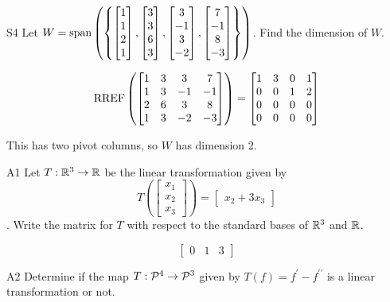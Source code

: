 \documentclass{sbgLAquiz}
\begin{document}
\begin{extract}\newpage\end{extract}
\begin{problem}{S4}
Let $W = {\rm span} \left( \left\{ \begin{bmatrix} 1 \\ 1 \\ 2 \\ 1 \end{bmatrix}, \begin{bmatrix} 3 \\ 3 \\ 6 \\ 3 \end{bmatrix}, \begin{bmatrix} 3 \\ -1 \\ 3 \\ -2 \end{bmatrix}, \begin{bmatrix} 7 \\ -1 \\ 8 \\ -3 \end{bmatrix} \right\} \right)$.  Find the dimension of $W$.
\end{problem}
\begin{solution}
$$\RREF\left(\begin{bmatrix} 1 & 3 & 3 & 7 \\ 1 & 3 & -1 & -1 \\ 2 & 6 & 3 & 8 \\ 1 & 3 & -2 & -3 \end{bmatrix}\right) = \begin{bmatrix} 1 & 3 & 0 & 1 \\ 0 & 0 & 1 & 2 \\ 0 & 0 & 0 & 0 \\  0 & 0 & 0 & 0 \end{bmatrix}$$

This has two pivot columns, so $W$ has dimension 2.
\end{solution}


\begin{problem}{A1}
Let $T: \IR^3 \rightarrow \IR$ be the linear transformation given by $$T\left(\begin{bmatrix} x_1 \\ x_2 \\ x_3  \end{bmatrix} \right) = \begin{bmatrix} x_2+3x_3 \end{bmatrix}$$. Write the matrix for $T$ with respect to the standard bases of $\IR^3$ and $\IR$.
\end{problem}
\begin{solution}
$$\begin{bmatrix} 0 & 1 & 3 \end{bmatrix}$$
\end{solution}
\begin{extract}\newpage\end{extract}
\begin{problem}{A2}
Determine if the map $T: \P ^4 \rightarrow \P^3$ given by $T(f) = f^{\prime}-f^{\prime \prime}$ is a linear transformation or not.
\end{problem}
\end{document}
